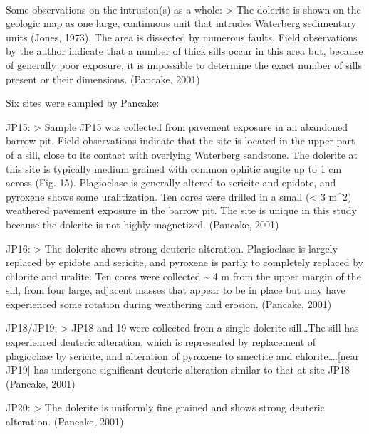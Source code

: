 \documentclass{article}
\begin{document}
    \begin{center}
    \end{center}
    { \hspace*{\fill} \\}
    
    Some observations on the intrusion(s) as a whole: \textgreater{} The
dolerite is shown on the geologic map as one large, continuous unit that
intrudes Waterberg sedimentary units (Jones, 1973). The area is
dissected by numerous faults. Field observations by the author indicate
that a number of thick sills occur in this area but, because of
generally poor exposure, it is impossible to determine the exact number
of sills present or their dimensions. (Pancake, 2001)

Six sites were sampled by Pancake:

JP15: \textgreater{} Sample JP15 was collected from pavement exposure in
an abandoned barrow pit. Field observations indicate that the site is
located in the upper part of a sill, close to its contact with overlying
Waterberg sandstone. The dolerite at this site is typically medium
grained with common ophitic augite up to 1 cm across (Fig. 15).
Plagioclase is generally altered to sericite and epidote, and pyroxene
shows some uralitization. Ten cores were drilled in a small (\textless{}
3 m\^{}2) weathered pavement exposure in the barrow pit. The site is
unique in this study because the dolerite is not highly magnetized.
(Pancake, 2001)

JP16: \textgreater{} The dolerite shows strong deuteric alteration.
Plagioclase is largely replaced by epidote and sericite, and pyroxene is
partly to completely replaced by chlorite and uralite. Ten cores were
collected \textasciitilde{} 4 m from the upper margin of the sill, from
four large, adjacent masses that appear to be in place but may have
experienced some rotation during weathering and erosion. (Pancake, 2001)

JP18/JP19: \textgreater{} JP18 and 19 were collected from a single
dolerite sill\ldots{}The sill has experienced deuteric alteration, which
is represented by replacement of plagioclase by sericite, and alteration
of pyroxene to smectite and chlorite\ldots{}.{[}near JP19{]} has
undergone significant deuteric alteration similar to that at site JP18
(Pancake, 2001)

JP20: \textgreater{} The dolerite is uniformly fine grained and shows
strong deuteric alteration. (Pancake, 2001)
\end{document}
